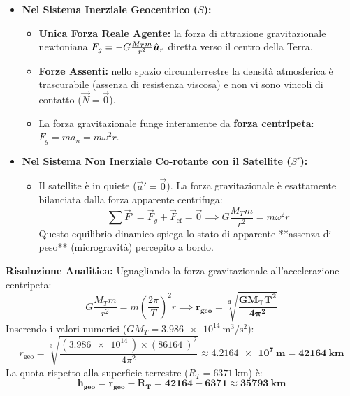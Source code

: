 \begin{tcolorbox}[enhanced, breakable, colback=forestgreen!5!white, colframe=forestgreen!80!black,
    title={\textbf{Analisi delle Forze nei Riferimenti Inerziale e Non Inerziale}}, fonttitle=\bfseries\sffamily]
\begin{itemize}
    \item \textbf{Nel Sistema Inerziale Geocentrico ($S$):}
    \begin{itemize}
        \item \textbf{Unica Forza Reale Agente:} la forza di attrazione gravitazionale newtoniana $\bm{F}_g = -G\frac{M_T m}{r^2}\hat{\bm{u}}_r$ diretta verso il centro della Terra.
        \item \textbf{Forze Assenti:} nello spazio circumterrestre la densità atmosferica è trascurabile (assenza di resistenza viscosa) e non vi sono vincoli di contatto ($\vec{N} = \vec{0}$).
        \item La forza gravitazionale funge interamente da \textbf{forza centripeta}: $F_g = m a_n = m \omega^2 r$.
    \end{itemize}
    \item \textbf{Nel Sistema Non Inerziale Co-rotante con il Satellite ($S'$):}
    \begin{itemize}
        \item Il satellite è in quiete ($\vec{a}' = \vec{0}$). La forza gravitazionale è esattamente bilanciata dalla forza apparente centrifuga:
        \begin{equation}
            \sum \vec{F}' = \vec{F}_g + \vec{F}_{\text{cf}} = \vec{0} \implies G\frac{M_T m}{r^2} = m\omega^2 r
        \end{equation}
        Questo equilibrio dinamico spiega lo stato di apparente **assenza di peso** (microgravità) percepito a bordo.
    \end{itemize}
\end{itemize}
\end{tcolorbox}

\textbf{Risoluzione Analitica:}
Uguagliando la forza gravitazionale all'accelerazione centripeta:
\begin{equation}
    G\frac{M_T m}{r^2} = m \left(\frac{2\pi}{T}\right)^2 r \implies \mathbf{r_{\text{geo}} = \sqrt[3]{\frac{G M_T T^2}{4\pi^2}}}
\end{equation}
Inserendo i valori numerici ($G M_T = \SI{3.986e14}{\metre\cubed\per\second\squared}$):
\begin{equation}
    r_{\text{geo}} = \sqrt[3]{\frac{(\SI{3.986e14}{})\times (\SI{86164}{})^2}{4\pi^2}} \approx \mathbf{\SI{4.2164e7}{\metre} = \SI{42164}{\kilo\metre}}
\end{equation}
La quota rispetto alla superficie terrestre ($R_T = \SI{6371}{\kilo\metre}$) è:
\begin{equation}
    \mathbf{h_{\text{geo}} = r_{\text{geo}} - R_T = 42164 - 6371 \approx \SI{35793}{\kilo\metre}}
\end{equation}
